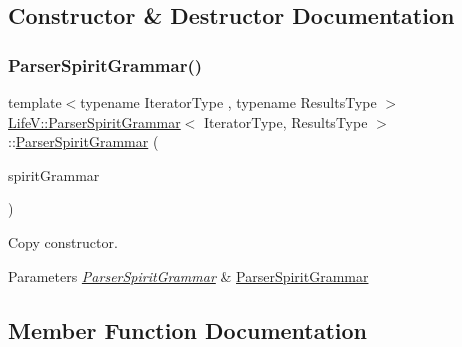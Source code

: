 \subsection{Constructor \& Destructor Documentation}
\mbox{\label{classLifeV_1_1ParserSpiritGrammar_a2a0d8a4396ae61a66edc4f320d9e79f5}} 
\subsubsection{\texorpdfstring{Parser\+Spirit\+Grammar()}{ParserSpiritGrammar()}}
{\footnotesize\ttfamily template$<$typename Iterator\+Type , typename Results\+Type $>$ \\
\hyperlink{classLifeV_1_1ParserSpiritGrammar}{Life\+V\+::\+Parser\+Spirit\+Grammar}$<$ Iterator\+Type, Results\+Type $>$\+::\hyperlink{classLifeV_1_1ParserSpiritGrammar}{Parser\+Spirit\+Grammar} (\begin{DoxyParamCaption}\item[{const \hyperlink{classLifeV_1_1ParserSpiritGrammar}{Parser\+Spirit\+Grammar}$<$ Iterator\+Type, Results\+Type $>$ \&}]{spirit\+Grammar }\end{DoxyParamCaption})\hspace{0.3cm}{\ttfamily [explicit]}}



Copy constructor. 


\begin{DoxyParams}{Parameters}
{\em \hyperlink{classLifeV_1_1ParserSpiritGrammar}{Parser\+Spirit\+Grammar}} & \hyperlink{classLifeV_1_1ParserSpiritGrammar}{Parser\+Spirit\+Grammar} \\
\hline
\end{DoxyParams}


\subsection{Member Function Documentation}
\mbox{\label{classLifeV_1_1ParserSpiritGrammar_a7ccdf51b58cd920a08d18adaea2524ca}} 
